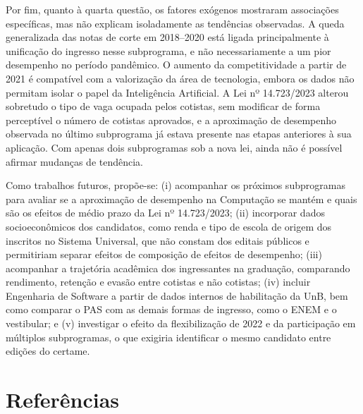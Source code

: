 \documentclass[12pt]{article}
\begin{document}
Por fim, quanto à quarta questão, os fatores exógenos mostraram associações específicas, mas não explicam isoladamente as tendências observadas. A queda generalizada das notas de corte em 2018--2020 está ligada principalmente à unificação do ingresso nesse subprograma, e não necessariamente a um pior desempenho no período pandêmico. O aumento da competitividade a partir de 2021 é compatível com a valorização da área de tecnologia, embora os dados não permitam isolar o papel da Inteligência Artificial. A Lei nº 14.723/2023 alterou sobretudo o tipo de vaga ocupada pelos cotistas, sem modificar de forma perceptível o número de cotistas aprovados, e a aproximação de desempenho observada no último subprograma já estava presente nas etapas anteriores à sua aplicação. Com apenas dois subprogramas sob a nova lei, ainda não é possível afirmar mudanças de tendência.

Como trabalhos futuros, propõe-se: (i) acompanhar os próximos subprogramas para avaliar se a aproximação de desempenho na Computação se mantém e quais são os efeitos de médio prazo da Lei nº 14.723/2023; (ii) incorporar dados socioeconômicos dos candidatos, como renda e tipo de escola de origem dos inscritos no Sistema Universal, que não constam dos editais públicos e permitiriam separar efeitos de composição de efeitos de desempenho; (iii) acompanhar a trajetória acadêmica dos ingressantes na graduação, comparando rendimento, retenção e evasão entre cotistas e não cotistas; (iv) incluir Engenharia de Software a partir de dados internos de habilitação da UnB, bem como comparar o PAS com as demais formas de ingresso, como o ENEM e o vestibular; e (v) investigar o efeito da flexibilização de 2022 e da participação em múltiplos subprogramas, o que exigiria identificar o mesmo candidato entre edições do certame.

\section{Referências}


\end{document}
